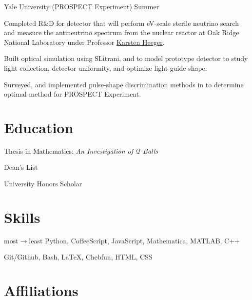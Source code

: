 \documentclass{cultvoucher}
\begin{document}
\begin{paracol}{2}
         {Yale University (\href{http://prospect.yale.edu/}{PROSPECT Experiment})}
         {Summer }
\begin{tightitemize}
	\item Completed R\&D for detector that will perform eV-scale sterile neutrino search and measure the antineutrino spectrum from the nuclear reactor at Oak Ridge National Laboratory under Professor \href{http://heegerlab.yale.edu/karsten-heeger}{Karsten Heeger}.
	\item Built optical simulation using SLitrani, and  to model prototype detector to study light collection, detector uniformity, and optimize light guide shape.
	\item Surveyed, and implemented pulse-shape discrimination methods in  to determine optimal method for PROSPECT Experiment.
\end{tightitemize}


\switchcolumn


\section{Education}
\vspace{-0.9\topsep}
\begin{tightitemize}
    \item Thesis in Mathematics: \textit{An \mbox{Investigation} of $\mathcal{Q}$-Balls}
    \item Dean's List
    \item University Honors Scholar
\end{tightitemize}
\vspace{-2\topsep}

\section{Skills}\vspace{-0.9\topsep}
         {most$\rightarrow$least}
         {Python, CoffeeScript, JavaScript, Mathematica, MATLAB, C++}

         {}
         {Git/Github, Bash, \LaTeX{}, Chebfun, HTML, CSS}

\vspace{-2\topsep}

\section{Affiliations}\vspace{-0.9\topsep}


\vspace{-2\topsep}

\end{paracol}
\end{document}
